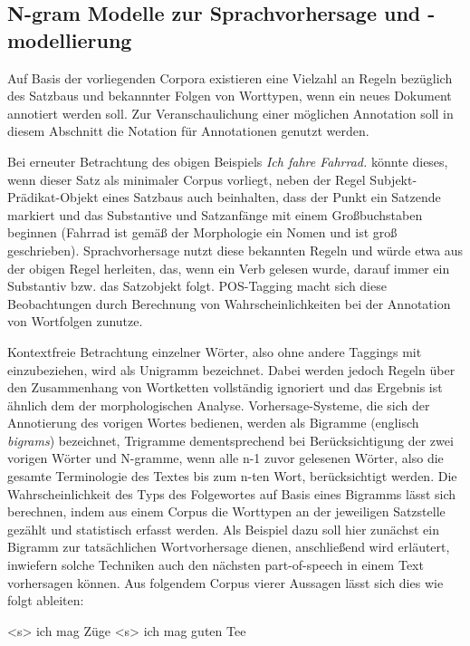 \documentclass[12pt]{report}
\begin{document}
\subsection{N-gram Modelle zur Sprachvorhersage und -modellierung}
Auf Basis der vorliegenden Corpora existieren eine Vielzahl an Regeln bezüglich des Satzbaus und bekannnter Folgen von Worttypen, wenn ein neues Dokument annotiert werden soll. Zur Veranschaulichung einer möglichen Annotation soll in diesem Abschnitt die Notation \cite{clw7} für Annotationen genutzt werden.

Bei erneuter Betrachtung des obigen Beispiels \textit{\glqq  Ich fahre Fahrrad.\grqq{}} könnte dieses, wenn dieser Satz als minimaler Corpus vorliegt, neben der Regel Subjekt-Prädikat-Objekt eines Satzbaus auch beinhalten, dass der Punkt ein Satzende markiert und das Substantive und Satzanfänge mit einem Großbuchstaben beginnen (\glqq  Fahrrad\grqq{} ist gemäß der Morphologie ein Nomen und ist groß geschrieben). Sprachvorhersage nutzt diese bekannten Regeln und würde etwa aus der obigen Regel herleiten, das, wenn ein Verb gelesen wurde, darauf immer ein Substantiv bzw. das Satzobjekt folgt. POS-Tagging macht sich diese Beobachtungen durch Berechnung von Wahrscheinlichkeiten bei der Annotation von Wortfolgen zunutze. 

Kontextfreie Betrachtung einzelner Wörter, also ohne andere Taggings mit einzubeziehen, wird als Unigramm bezeichnet. Dabei werden jedoch Regeln über den Zusammenhang von Wortketten vollständig ignoriert und das Ergebnis ist ähnlich dem der morphologischen Analyse. Vorhersage-Systeme, die sich der Annotierung des vorigen Wortes bedienen, werden als Bigramme (englisch \textit{bigrams}) bezeichnet, Trigramme dementsprechend bei Berücksichtigung der zwei vorigen Wörter und N-gramme, wenn alle n-1 zuvor gelesenen Wörter, also die gesamte Terminologie des Textes bis zum n-ten Wort, berücksichtigt werden.
Die Wahrscheinlichkeit des Typs des Folgewortes auf Basis eines Bigramms lässt sich berechnen, indem aus einem Corpus die Worttypen an der jeweiligen Satzstelle gezählt und statistisch erfasst werden. 
Als Beispiel dazu soll hier zunächst ein Bigramm zur tatsächlichen Wortvorhersage dienen, anschließend wird erläutert, inwiefern solche Techniken auch den nächsten part-of-speech in einem Text vorhersagen können. Aus folgendem Corpus vierer Aussagen lässt sich dies wie folgt ableiten:
\\ \tt

<s> ich mag Züge <s> ich mag guten Tee 
\end{document}
